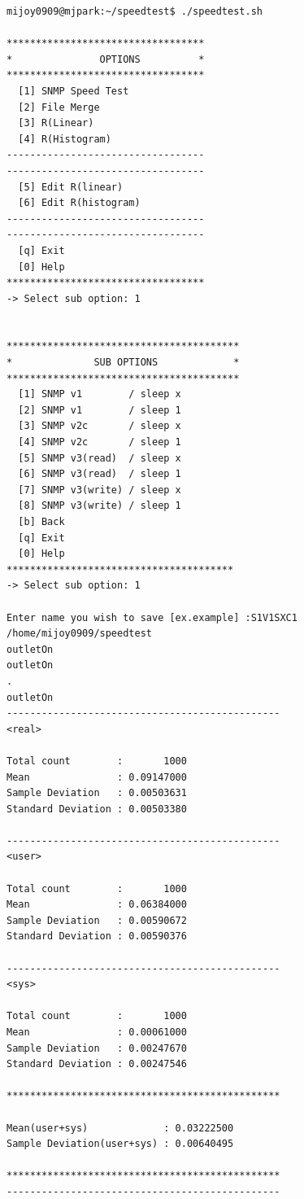 \documentclass[11pt
  , a4paper
  , article
  , oneside
]{memoir}
\begin{document}
\begin{lstlisting}[style=termstyle, caption=GNU Bash script를 통한 CLI]
mijoy0909@mjpark:~/speedtest$ ./speedtest.sh 

**********************************
*               OPTIONS          *
**********************************
  [1] SNMP Speed Test             
  [2] File Merge                  
  [3] R(Linear)                   
  [4] R(Histogram)                
----------------------------------
----------------------------------
  [5] Edit R(linear)              
  [6] Edit R(histogram)           
----------------------------------
----------------------------------
  [q] Exit                        
  [0] Help                        
**********************************
-> Select sub option: 1


****************************************
*              SUB OPTIONS             *
****************************************
  [1] SNMP v1        / sleep x          
  [2] SNMP v1        / sleep 1          
  [3] SNMP v2c       / sleep x          
  [4] SNMP v2c       / sleep 1          
  [5] SNMP v3(read)  / sleep x          
  [6] SNMP v3(read)  / sleep 1          
  [7] SNMP v3(write) / sleep x          
  [8] SNMP v3(write) / sleep 1          
  [b] Back                              
  [q] Exit                              
  [0] Help                              
***************************************
-> Select sub option: 1

Enter name you wish to save [ex.example] :S1V1SXC1
/home/mijoy0909/speedtest
outletOn
outletOn
.
outletOn
-----------------------------------------------
<real>

Total count        :       1000
Mean               : 0.09147000
Sample Deviation   : 0.00503631
Standard Deviation : 0.00503380

-----------------------------------------------
<user>

Total count        :       1000
Mean               : 0.06384000
Sample Deviation   : 0.00590672
Standard Deviation : 0.00590376

-----------------------------------------------
<sys>

Total count        :       1000
Mean               : 0.00061000
Sample Deviation   : 0.00247670
Standard Deviation : 0.00247546

***********************************************

Mean(user+sys)             : 0.03222500
Sample Deviation(user+sys) : 0.00640495

***********************************************
-----------------------------------------------
\end{lstlisting}
\end{document}
